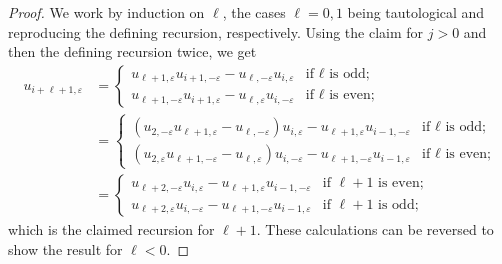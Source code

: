 \documentclass{amsart}
\numberwithin{theorem}{section}
\begin{document}
  \begin{proof}
    We work by induction on $\ell$, the cases $\ell=0,1$ being tautological and reproducing the defining recursion, respectively.
    Using the claim for $j>0$ and then the defining recursion twice, we get
    \begin{align*}
      u_{i+\ell+1,\varepsilon}&=\begin{cases} u_{\ell+1,\varepsilon}u_{i+1,-\varepsilon}-u_{\ell,-\varepsilon}u_{i,\varepsilon} & \text{if $\ell$ is odd;}\\ u_{\ell+1,-\varepsilon}u_{i+1,\varepsilon}-u_{\ell,\varepsilon}u_{i,-\varepsilon} & \text{if $\ell$ is even;} \end{cases}\\
      &=\begin{cases} (u_{2,-\varepsilon}u_{\ell+1,\varepsilon}-u_{\ell,-\varepsilon})u_{i,\varepsilon}-u_{\ell+1,\varepsilon}u_{i-1,-\varepsilon} & \text{if $\ell$ is odd;}\\ (u_{2,\varepsilon}u_{\ell+1,-\varepsilon}-u_{\ell,\varepsilon})u_{i,-\varepsilon}-u_{\ell+1,-\varepsilon}u_{i-1,\varepsilon} & \text{if $\ell$ is even;} \end{cases}\\
      &=\begin{cases} u_{\ell+2,-\varepsilon}u_{i,\varepsilon}-u_{\ell+1,\varepsilon}u_{i-1,-\varepsilon} & \text{if $\ell+1$ is even;}\\ u_{\ell+2,\varepsilon}u_{i,-\varepsilon}-u_{\ell+1,-\varepsilon}u_{i-1,\varepsilon} & \text{if $\ell+1$ is odd;} \end{cases}
    \end{align*}
    which is the claimed recursion for $\ell+1$.
    These calculations can be reversed to show the result for $\ell<0$.
  \end{proof}
\end{document}
